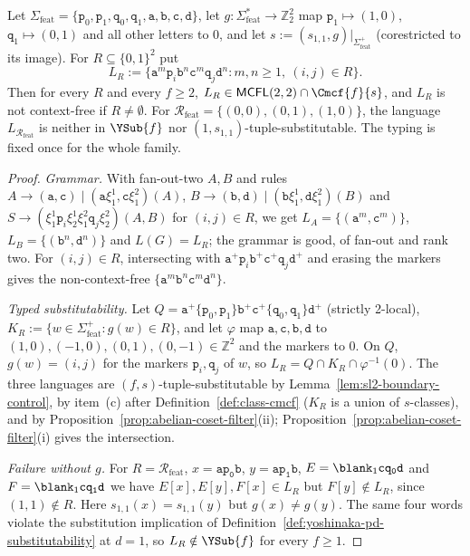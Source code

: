 \begin{proposition}
\label{prop:feature-cross-typed}
Let $\Sigma_{\mathrm{feat}}=\{\mathtt p_0,\mathtt p_1,\allowbreak\mathtt q_0,\mathtt q_1,\allowbreak
\mathtt a,\mathtt b,\mathtt c,\mathtt d\}$, let $g:\Sigma_{\mathrm{feat}}^*\to\mathbb Z_2^2$
map $\mathtt p_1\mapsto(1,0)$, $\mathtt q_1\mapsto(0,1)$ and all other letters to $0$, and
let $s:=(s_{1,1},g)|_{\Sigma_{\mathrm{feat}}^+}$ (corestricted to its image).  For
$R\subseteq\{0,1\}^2$ put
\[
 L_R:=\{\mathtt a^m\mathtt p_i\mathtt b^n\mathtt c^m\mathtt q_j\mathtt d^n:
 m,n\ge1,\ (i,j)\in R\}.
\]
Then for every $R$ and every $f\ge2$, $L_R\in\mathsf{MCFL}(2,2)\cap\Cmcf{f}{s}$, and
$L_R$ is not context-free if $R\ne\emptyset$.  For
$\mathcal R_{\mathrm{feat}}=\{(0,0),(0,1),(1,0)\}$, the language
$L_{\mathcal R_{\mathrm{feat}}}$ is neither in $\YSub{f}$ nor
$(1,s_{1,1})$-tuple-substitutable.  The typing is fixed once for the whole
family.
\end{proposition}

\begin{proof}
\emph{Grammar.}  With fan-out-two $A,B$ and rules
$A\to(\mathtt a,\mathtt c)\mid(\mathtt a\xi_1^1,\mathtt c\xi_1^2)(A)$,
$B\to(\mathtt b,\mathtt d)\mid(\mathtt b\xi_1^1,\mathtt d\xi_1^2)(B)$ and
$S\to(\xi_1^1\mathtt p_i\xi_2^1\xi_1^2\mathtt q_j\xi_2^2)(A,B)$ for
$(i,j)\in R$, we get $L_A=\{(\mathtt a^m,\mathtt c^m)\}$,
$L_B=\{(\mathtt b^n,\mathtt d^n)\}$ and $L(G)=L_R$; the grammar is good,
of fan-out and rank two.  For $(i,j)\in R$, intersecting with
$\mathtt a^+\mathtt p_i\mathtt b^+\mathtt c^+\mathtt q_j\mathtt d^+$ and erasing the
markers gives the non-context-free $\{\mathtt a^m\mathtt b^n\mathtt c^m\mathtt d^n\}$.

\emph{Typed substitutability.}  Let
$Q=\mathtt a^+\{\mathtt p_0,\mathtt p_1\}\mathtt b^+\mathtt c^+\{\mathtt q_0,\mathtt q_1\}
\mathtt d^+$ (strictly 2-local), $K_R:=\{w\in\Sigma_{\mathrm{feat}}^+:g(w)\in R\}$, and let
$\varphi$ map $\mathtt a,\mathtt c,\mathtt b,\mathtt d$ to
$(1,0),(-1,0),(0,1),(0,-1)\in\mathbb Z^2$ and the markers to $0$.  On $Q$,
$g(w)=(i,j)$ for the markers $\mathtt p_i,\mathtt q_j$ of $w$, so
$L_R=Q\cap K_R\cap\varphi^{-1}(0)$.  The three languages are
$(f,s)$-tuple-substitutable by Lemma~\ref{lem:sl2-boundary-control}, by item~(c)
after Definition~\ref{def:class-cmcf} ($K_R$ is a union of $s$-classes), and by
Proposition~\ref{prop:abelian-coset-filter}(ii);
Proposition~\ref{prop:abelian-coset-filter}(i) gives the intersection.

\emph{Failure without $g$.}  For $R=\mathcal R_{\mathrm{feat}}$, $x=\mathtt{ap_0b}$,
$y=\mathtt{ap_1b}$, $E=\blank_1\mathtt{cq_0d}$ and $F=\blank_1\mathtt{cq_1d}$ we have
$E[x],E[y],F[x]\in L_R$ but $F[y]\notin L_R$, since $(1,1)\notin R$.  Here
$s_{1,1}(x)=s_{1,1}(y)$ but $g(x)\ne g(y)$.  The same four words violate the
substitution implication of Definition~\ref{def:yoshinaka-pd-substitutability} at
$d=1$, so $L_R\notin\YSub{f}$ for every $f\ge1$.
\end{proof}


